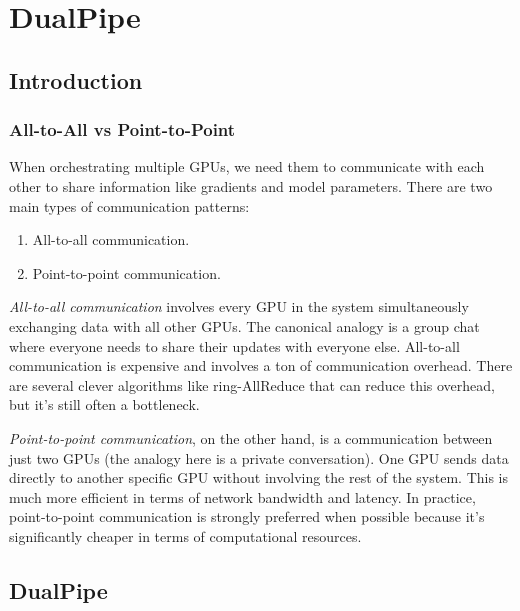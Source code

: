 \chapter{DualPipe}

\section{Introduction}
\subsection{All-to-All vs Point-to-Point}

When orchestrating multiple GPUs, we need them to communicate with each other to share information like gradients and model parameters. There are two main types of communication patterns: 
\begin{enumerate}
	\item All-to-all communication.
	\item Point-to-point communication.
\end{enumerate}

\textit{All-to-all communication} involves every GPU in the system simultaneously exchanging data with all other GPUs. The canonical analogy is a group chat where everyone needs to share their updates with everyone else. All-to-all communication is expensive and involves a ton of communication overhead. There are several clever algorithms like ring-AllReduce that can reduce this overhead, but it's still often a bottleneck.

\textit{Point-to-point communication}, on the other hand, is a communication between just two GPUs (the analogy here is a private conversation). One GPU sends data directly to another specific GPU without involving the rest of the system. This is much more efficient in terms of network bandwidth and latency. In practice, point-to-point communication is strongly preferred when possible because it's significantly cheaper in terms of computational resources.



\section{DualPipe}

